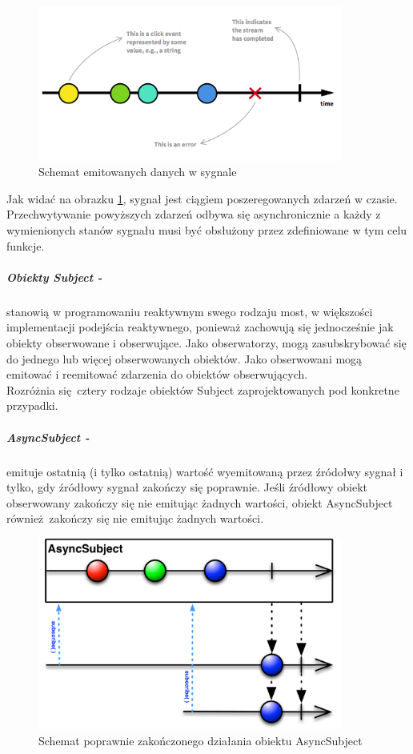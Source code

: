 \documentclass[12pt,oneside,a4paper]{report}
\begin{document}
\begin{figure}[ht!]
\centering
\includegraphics[width=10cm]{sygnalRx}
\caption{Schemat emitowanych danych w sygnale \cite{introToRx}}
\label{sygnalRx}
\end{figure}

Jak widać na obrazku \ref{sygnalRx}, sygnał jest ciągiem poszeregowanych zdarzeń w czasie. Przechwytywanie powyższych zdarzeń odbywa się asynchronicznie a każdy z wymienionych stanów sygnału musi być obsłużony przez zdefiniowane w tym celu funkcje. \\
\subparagraph{Obiekty Subject -}stanowią w programowaniu reaktywnym swego rodzaju most, w większości implementacji podejścia reaktywnego, ponieważ zachowują się jednocześnie jak obiekty obserwowane i obserwujące. Jako obserwatorzy, mogą zasubskrybować się do jednego lub więcej obserwowanych obiektów. Jako obserwowani mogą emitować i reemitować zdarzenia do obiektów obserwujących.\\
Rozróżnia się cztery rodzaje obiektów Subject zaprojektowanych pod konkretne przypadki.  
\subparagraph{AsyncSubject -}emituje ostatnią (i tylko ostatnią) wartość wyemitowaną przez źródołwy sygnał i tylko, gdy źródłowy sygnał zakończy się poprawnie. Jeśli źródłowy obiekt obserwowany zakończy się nie emitując żadnych wartości, obiekt AsyncSubject również zakończy się nie emitując żadnych wartości.
\begin{figure}[ht!]
	\centering
	\includegraphics[width=10cm]{asyncSubject}
	\caption{Schemat poprawnie zakończonego działania obiektu AsyncSubject \cite{subjects}}
	\label{asyncSubject}
\end{figure}
\end{document}
